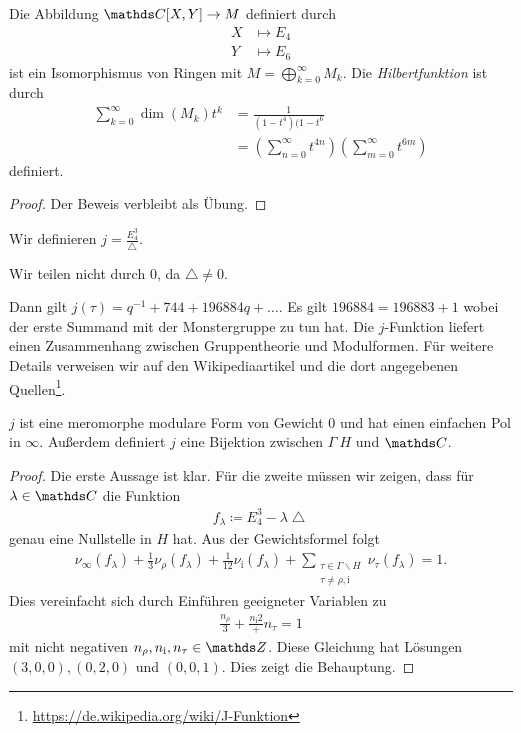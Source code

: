\begin{thm}
Die Abbildung $\C[X,Y]\to M$ definiert durch
\begin{align*}
X &\mapsto E_4\\
Y &\mapsto E_6
\end{align*}
ist ein Isomorphismus von Ringen mit $M =\bigoplus_{k=0}^\infty M_k$.
Die \emph{Hilbertfunktion} ist durch
\begin{align*}
\sum_{k=0}^\infty \dim(M_k)t^k&=\frac{1}{(1-t^4)(1-t^6}\\
&=\left(\sum_{n=0}^\infty t^{4n}\right) \left(\sum_{m=0}^\infty t^{6m}\right)
\end{align*}
definiert.
\end{thm}
\begin{proof}
Der Beweis verbleibt als Übung.
\end{proof}

\begin{defi}
Wir definieren $j=\frac{E_4^3}{\bigtriangleup}$.
\end{defi}
Wir teilen nicht durch $0$, da $\bigtriangleup\not = 0$.

\begin{bem}
Dann gilt $j(\tau)=q^{-1} +744 + 196884q+ \dots$.
Es gilt $196884=196883+1$ wobei der erste Summand mit der Monstergruppe zu tun hat.
Die $j$-Funktion liefert einen Zusammenhang zwischen Gruppentheorie und Modulformen.
Für weitere Details verweisen wir auf den Wikipediaartikel und die dort angegebenen Quellen\footnote{\url{https://de.wikipedia.org/wiki/J-Funktion}}.
\end{bem}

\begin{prop}
$j$ ist eine meromorphe modulare Form von Gewicht $0$ und hat einen
einfachen Pol in $\infty$.
Außerdem definiert $j$ eine Bijektion zwischen $\Gamma\ H$ und $\C$.
\end{prop}
\begin{proof}
Die erste Aussage ist klar.
Für die zweite müssen wir zeigen, dass für $\lambda \in \C$ die Funktion
\begin{align*}
f_\lambda\coloneqq E_4^3-\lambda \bigtriangleup
\end{align*}
genau eine Nullstelle in $H$ hat.
Aus der Gewichtsformel folgt
\begin{align*}
\nu_\infty(f_\lambda)+\frac{1}{3}\nu_\rho(f_\lambda)+\frac{1}{12}\nu_{\mathrm{i}}(f_\lambda)+\sum_{\substack{\tau \in \Gamma\backslash H\\ \tau \not = \rho,\mathrm{i}}} \nu_\tau(f_\lambda)=1.
\end{align*}
Dies vereinfacht sich durch Einführen geeigneter Variablen zu
\begin{align*}
\frac{n_\rho}{3}+\frac{n_{\mathrm{i}}{2}}+n_\tau=1
\end{align*}
mit nicht negativen $n_\rho,n_\mathrm{i},n_\tau \in \Z$.
Diese Gleichung hat Lösungen $(3,0,0),(0,2,0)$ und $(0,0,1)$.
Dies zeigt die Behauptung.
\end{proof}

